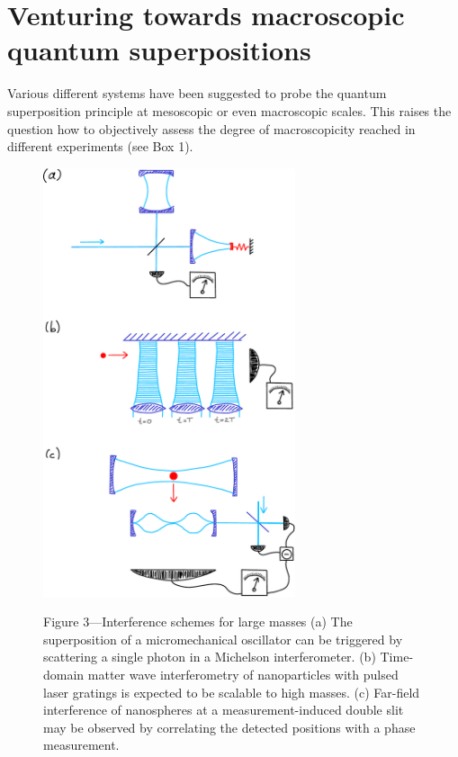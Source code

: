 \documentclass[12pt]{article}
\begin{document}
\section{Venturing towards macroscopic quantum superpositions }

Various different systems have been suggested to probe the quantum superposition principle at mesoscopic or even macroscopic scales.
This raises the question how to objectively assess the degree of macroscopicity reached in different experiments\cite{Nimmrichter2013} (see Box 1).


\begin{figure}
\centerline{
\includegraphics[width=0.66\textwidth]{Fig3-sketch.pdf}}
\small
{Figure 3---Interference schemes for large masses}
(a) The superposition of a micromechanical oscillator can be triggered by scattering a single photon in a Michelson interferometer.
(b) Time-domain matter wave interferometry  of nanoparticles with pulsed laser gratings is expected to be scalable to high masses.
(c) Far-field interference of nanospheres at a measurement-induced double slit may be observed by correlating the detected positions with a phase measurement. 
\end{figure} 
\end{document}
